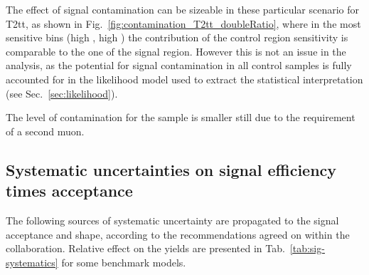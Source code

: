 
The effect of signal contamination can be sizeable in these particular
scenario for T2tt, as shown in
Fig.~\ref{fig:contamination_T2tt_doubleRatio}, where in the most
sensitive bins (high \njet, high \nb) the contribution of the control
region sensitivity is comparable to the one of the signal
region. However this is not an issue in the analysis, as the potential
for signal contamination in all control samples is fully accounted for
in the likelihood model used to extract the statistical interpretation
(see Sec.~\ref{sec:likelihood}).

The level of contamination for the \mmj sample is smaller still due to the
requirement of a second muon.

\subsection{Systematic uncertainties on signal efficiency times acceptance}
\label{sec:sig-syst}
The following sources of systematic uncertainty are propagated to the signal
acceptance and shape, according to the recommendations agreed on within the
collaboration. Relative effect on the yields are presented in
Tab.~\ref{tab:sig-systematics} for some benchmark models.

